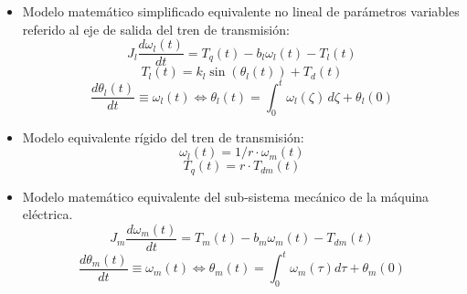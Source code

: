 \documentclass[a4paper, 10pt, onecolumn,journal]{ieeeconf}
\begin{document}
\begin{itemize}
    \item Modelo matemático simplificado equivalente no lineal de parámetros variables referido al eje de salida del tren de transmisión:
    \begin{equation}
        J_l \frac{d\omega_l(t)}{dt} = T_q(t) - b_l \omega_l(t) - T_l(t)
        \label{carga mecanica}
    \end{equation}
    \begin{equation}
        T_l(t) = k_l \sin(\theta_l(t)) + T_d(t)
        \label{torque de carga}
    \end{equation}
    \begin{equation}
        \frac{d\theta_l(t)}{dt} \equiv \omega_l(t) \Leftrightarrow \theta_l(t) = \int_{0}^{t} \omega_l(\zeta) \, d\zeta + \theta_l(0)
        \label{velocidad y posición de la carga}
    \end{equation}

    \item Modelo equivalente rígido del tren de transmisión:
    \begin{equation}
        \omega_l(t) = 1/r \cdot \omega_m(t)
        \label{relacion de velocidad en caja}
    \end{equation}
    \begin{equation}
        T_q(t) = r \cdot T_{dm}(t)
        \label{relacion de torque en caja}
    \end{equation}
    
    \item Modelo matemático equivalente del sub-sistema mecánico de la máquina eléctrica.
    \begin{equation}
        J_m \frac{d\omega_m(t)}{dt} = T_m(t) - b_m \omega_m(t) - T_{dm}(t)
        \label{subsistema mecanico maquina electrica}
    \end{equation}
    \begin{equation}
        \frac{d\theta_m(t)}{dt} \equiv \omega_m(t) \Leftrightarrow \theta_m(t) = \int_{0}^{t} \omega_m(\tau) d\tau + \theta_m(0)
        \label{posicion y velocidad motor}
    \end{equation}


\end{itemize}
\end{document}
